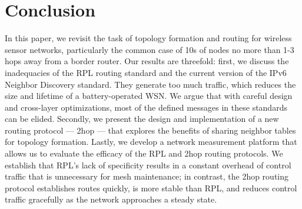\section{Conclusion}

In this paper, we revisit the task of topology formation and routing for wireless sensor networks, particularly the common case of 10s of nodes no more than 1-3 hops away from a border router.
Our results are threefold: first, we discuss the inadequacies of the RPL routing standard and the current version of the IPv6 Neighbor Discovery standard.
They generate too much traffic, which reduces the size and lifetime of a battery-operated WSN.
We argue that with careful design and cross-layer optimizations, most of the defined messages in these standards can be elided.
Secondly, we present the design and implementation of a new routing protocol --- 2hop --- that explores the benefits of sharing neighbor tables for topology formation.
Lastly, we develop a network measurement platform that allows us to evaluate the efficacy of the RPL and 2hop routing protocols.
We establish that RPL's lack of specificity results in a constant overhead of control traffic that is unnecessary for mesh maintenance; in contrast, the 2hop routing protocol establishes routes quickly, is more stable than RPL, and reduces control traffic gracefully as the network approaches a steady state.
